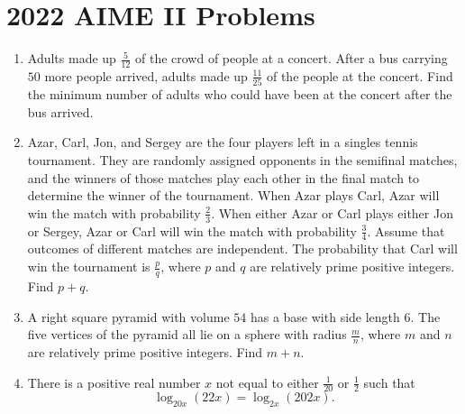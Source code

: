 \documentclass{article}
\begin{document}
\newpage\section*{2022 AIME II Problems}

\begin{enumerate}[label=\arabic*., itemsep=0.5em]
\item Adults made up \(\frac5{12}\) of the crowd of people at a concert. After a bus carrying \(50\) more people arrived, adults made up \(\frac{11}{25}\) of the people at the concert. Find the minimum number of adults who could have been at the concert after the bus arrived.\par \vspace{0.5em}\item Azar, Carl, Jon, and Sergey are the four players left in a singles tennis tournament. They are randomly assigned opponents in the semifinal matches, and the winners of those matches play each other in the final match to determine the winner of the tournament. When Azar plays Carl, Azar will win the match with probability \(\frac23\). When either Azar or Carl plays either Jon or Sergey, Azar or Carl will win the match with probability \(\frac34\). Assume that outcomes of different matches are independent. The probability that Carl will win the tournament is \(\frac{p}{q}\), where \(p\) and \(q\) are relatively prime positive integers. Find \(p+q\).\par \vspace{0.5em}\item A right square pyramid with volume \(54\) has a base with side length \(6.\) The five vertices of the pyramid all lie on a sphere with radius \(\frac mn\), where \(m\) and \(n\) are relatively prime positive integers. Find \(m+n\).\par \vspace{0.5em}\item There is a positive real number \(x\) not equal to either \(\tfrac{1}{20}\) or \(\tfrac{1}{2}\) such that
\begin{equation*}
\log_{20x} (22x)=\log_{2x} (202x).
\end{equation*}

\end{enumerate}
\end{document}

